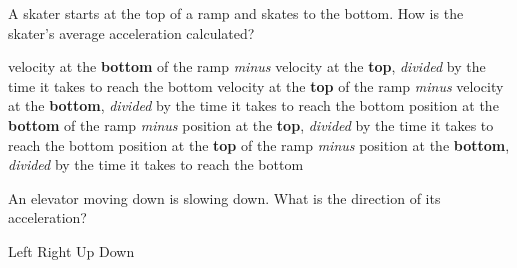 \documentclass[addpoints]{exam}
\begin{document}
\begin{center}
\end{center}

\begin{questions}



\question %
A skater starts at the top of a ramp and skates to the bottom. How is the skater's average acceleration calculated?

\begin{choices}
\CorrectChoice velocity at the \textbf{bottom} of the ramp \textit{minus} velocity at the \textbf{top}, \textit{divided} by the time it takes to reach the bottom
\choice velocity at the \textbf{top} of the ramp \textit{minus} velocity at the \textbf{bottom}, \textit{divided} by the time it takes to reach the bottom
\choice position at the \textbf{bottom} of the ramp \textit{minus} position at the \textbf{top}, \textit{divided} by the time it takes to reach the bottom
\choice position at the \textbf{top} of the ramp \textit{minus} position at the \textbf{bottom}, \textit{divided} by the time it takes to reach the bottom
\end{choices}


\question %
An elevator moving down is slowing down. What is the direction of its acceleration?

\begin{choices}
\choice Left
\choice Right 
\choice Up
\correctchoice Down
\end{choices}





\end{questions}
\end{document}

